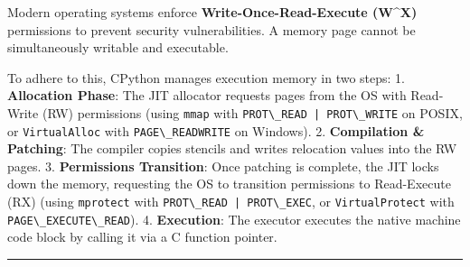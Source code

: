 Modern operating systems enforce \textbf{Write-Once-Read-Execute
(W\^{}X)} permissions to prevent security vulnerabilities. A memory page
cannot be simultaneously writable and executable.

To adhere to this, CPython manages execution memory in two steps: 1.
\textbf{Allocation Phase}: The JIT allocator requests pages from the OS
with Read-Write (RW) permissions (using \passthrough{\lstinline!mmap!}
with \passthrough{\lstinline!PROT\_READ | PROT\_WRITE!} on POSIX, or
\passthrough{\lstinline!VirtualAlloc!} with
\passthrough{\lstinline!PAGE\_READWRITE!} on Windows). 2.
\textbf{Compilation \& Patching}: The compiler copies stencils and
writes relocation values into the RW pages. 3. \textbf{Permissions
Transition}: Once patching is complete, the JIT locks down the memory,
requesting the OS to transition permissions to Read-Execute (RX) (using
\passthrough{\lstinline!mprotect!} with
\passthrough{\lstinline!PROT\_READ | PROT\_EXEC!}, or
\passthrough{\lstinline!VirtualProtect!} with
\passthrough{\lstinline!PAGE\_EXECUTE\_READ!}). 4. \textbf{Execution}:
The executor executes the native machine code block by calling it via a
C function pointer.

\begin{center}\rule{0.5\linewidth}{0.5pt}\end{center}
